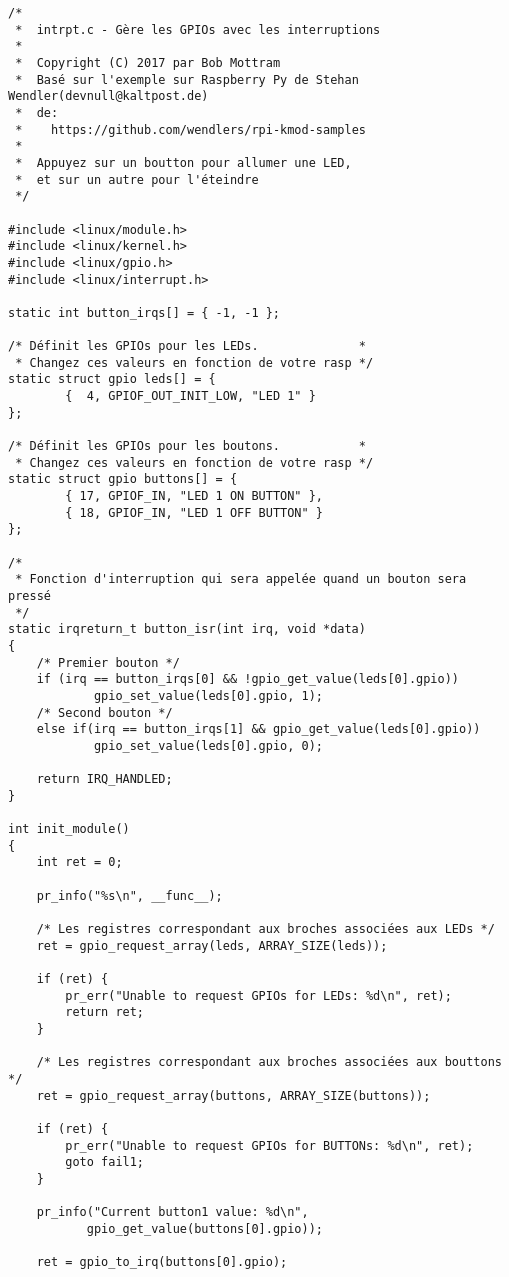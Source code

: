 \documentclass[11pt]{article}
\begin{document}
\begin{verbatim}
/*
 *  intrpt.c - Gère les GPIOs avec les interruptions
 *
 *  Copyright (C) 2017 par Bob Mottram
 *  Basé sur l'exemple sur Raspberry Py de Stehan Wendler(devnull@kaltpost.de)
 *  de:
 *    https://github.com/wendlers/rpi-kmod-samples
 *
 *  Appuyez sur un boutton pour allumer une LED,
 *  et sur un autre pour l'éteindre
 */

#include <linux/module.h>
#include <linux/kernel.h>
#include <linux/gpio.h>
#include <linux/interrupt.h>

static int button_irqs[] = { -1, -1 };

/* Définit les GPIOs pour les LEDs.              *
 * Changez ces valeurs en fonction de votre rasp */
static struct gpio leds[] = {
        {  4, GPIOF_OUT_INIT_LOW, "LED 1" }
};

/* Définit les GPIOs pour les boutons.           *
 * Changez ces valeurs en fonction de votre rasp */
static struct gpio buttons[] = {
        { 17, GPIOF_IN, "LED 1 ON BUTTON" },
        { 18, GPIOF_IN, "LED 1 OFF BUTTON" }
};

/*
 * Fonction d'interruption qui sera appelée quand un bouton sera pressé
 */
static irqreturn_t button_isr(int irq, void *data)
{
    /* Premier bouton */
    if (irq == button_irqs[0] && !gpio_get_value(leds[0].gpio))
            gpio_set_value(leds[0].gpio, 1);
    /* Second bouton */
    else if(irq == button_irqs[1] && gpio_get_value(leds[0].gpio))
            gpio_set_value(leds[0].gpio, 0);

    return IRQ_HANDLED;
}

int init_module()
{
    int ret = 0;

    pr_info("%s\n", __func__);

    /* Les registres correspondant aux broches associées aux LEDs */
    ret = gpio_request_array(leds, ARRAY_SIZE(leds));

    if (ret) {
        pr_err("Unable to request GPIOs for LEDs: %d\n", ret);
        return ret;
    }

    /* Les registres correspondant aux broches associées aux bouttons */
    ret = gpio_request_array(buttons, ARRAY_SIZE(buttons));

    if (ret) {
        pr_err("Unable to request GPIOs for BUTTONs: %d\n", ret);
        goto fail1;
    }

    pr_info("Current button1 value: %d\n",
           gpio_get_value(buttons[0].gpio));

    ret = gpio_to_irq(buttons[0].gpio);


\end{verbatim}
\end{document}
